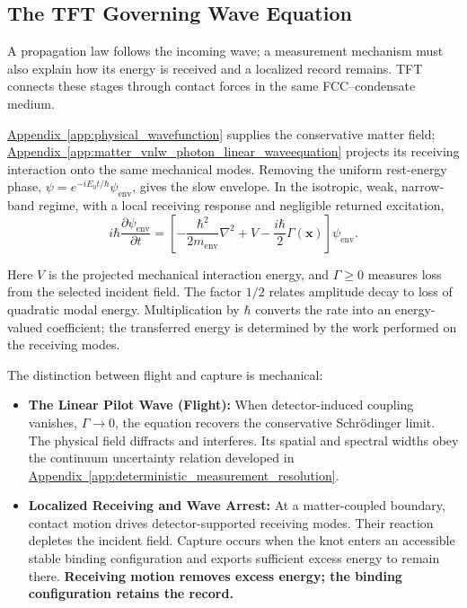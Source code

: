 \subsection{The TFT Governing Wave Equation}

A propagation law follows the incoming wave; a measurement mechanism must also explain how its energy is received and a localized record remains. TFT connects these stages through contact forces in the same FCC--condensate medium.

\hyperref[app:physical_wavefunction]{Appendix~\ref*{app:physical_wavefunction}} supplies the conservative matter field; \hyperref[app:matter_vnlw_photon_linear_waveequation]{Appendix~\ref*{app:matter_vnlw_photon_linear_waveequation}} projects its receiving interaction onto the same mechanical modes. Removing the uniform rest-energy phase, $\psi=e^{-iE_0t/\hbar}\psi_{\mathrm{env}}$, gives the slow envelope. In the isotropic, weak, narrow-band regime, with a local receiving response and negligible returned excitation,
\begin{equation}
    i\hbar\frac{\partial\psi_{\mathrm{env}}}{\partial t}
    =
    \left[
        -\frac{\hbar^2}{2m_{\mathrm{env}}}\nabla^2
        +V
        -\frac{i\hbar}{2}\Gamma(\mathbf x)
    \right]\psi_{\mathrm{env}}.
\end{equation}

Here $V$ is the projected mechanical interaction energy, and $\Gamma\geq0$ measures loss from the selected incident field. The factor $1/2$ relates amplitude decay to loss of quadratic modal energy. Multiplication by $\hbar$ converts the rate into an energy-valued coefficient; the transferred energy is determined by the work performed on the receiving modes.

The distinction between flight and capture is mechanical:
\begin{itemize}
    \item \textbf{The Linear Pilot Wave (Flight):}
    When detector-induced coupling vanishes, $\Gamma\to0$, the equation recovers the conservative Schr\"{o}dinger limit. The physical field diffracts and interferes. Its spatial and spectral widths obey the continuum uncertainty relation developed in \hyperref[app:deterministic_measurement_resolution]{Appendix~\ref*{app:deterministic_measurement_resolution}}.

    \item \textbf{Localized Receiving and Wave Arrest:}
    At a matter-coupled boundary, contact motion drives detector-supported receiving modes. Their reaction depletes the incident field. Capture occurs when the knot enters an accessible stable binding configuration and exports sufficient excess energy to remain there. \textbf{Receiving motion removes excess energy; the binding configuration retains the record.}
\end{itemize}

